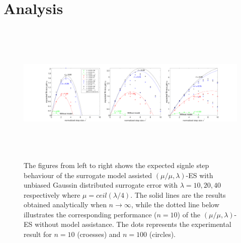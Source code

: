 





\section{Analysis}


\begin{center}
\begin{figure}
\includegraphics[height=2.7in, width=7.1in]{expectedFitGain}
\caption{The figures from left to right shows the expected signle step behaviour of the surrogate model assisted $(\mu/\mu,\lambda)$-ES with unbiased Gaussin distributed surrogate error with $\lambda=10,20,40$ respectively where $\mu = ceil(\lambda/4)$. The solid lines are the results obtained analytically when $n \rightarrow \infty$, while the dotted line below illustrates the corresponding performance ($n=10$) of the $(\mu/\mu,\lambda)$-ES without model assistance. The dots represents the experimental result for $n=10$ (croesses) and $n=100$ (circles).}
\end{figure}
\end{center}


